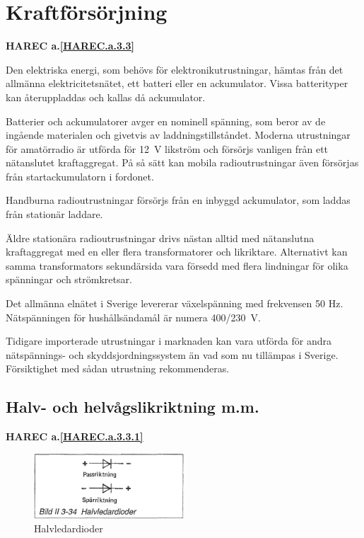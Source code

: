 \section{Kraftförsörjning}
\textbf{HAREC a.\ref{HAREC.a.3.3}\label{myHAREC.a.3.3}}
\label{kraftaggregat}

Den elektriska energi, som behövs för elektronikutrustningar, hämtas
från det allmänna elektricitetsnätet, ett batteri eller en
ackumulator. Vissa batterityper kan återuppladdas och kallas då
ackumulator.

Batterier och ackumulatorer avger en nominell spänning, som beror av
de ingående materialen och givetvis av laddningstillståndet. Moderna
utrustningar för amatörradio är utförda för 12~V likström och försörjs
vanligen från ett nätanslutet kraftaggregat. På så sätt kan mobila
radioutrustningar även försörjas från startackumulatorn i fordonet.

Handburna radioutrustningar försörjs från en inbyggd ackumulator, som
laddas från stationär laddare.

Äldre stationära radioutrustningar drivs nästan alltid med nätanslutna
kraftaggregat med en eller flera transformatorer och
likriktare. Alternativt kan samma transformators sekundärsida vara
försedd med flera lindningar för olika spänningar och strömkretsar.

Det allmänna elnätet i Sverige levererar växelspänning med frekvensen
50 Hz. Nätspänningen för hushållsändamål är numera 400/230~V.

Tidigare importerade utrustningar i marknaden kan vara utförda för
andra nätspännings- och skyddsjordningssystem än vad som nu tillämpas
i Sverige. Försiktighet med sådan utrustning rekommenderas.

\subsection{Halv- och helvågslikriktning m.m.}
\textbf{HAREC a.\ref{HAREC.a.3.3.1}\label{myHAREC.a.3.3.1}}

\begin{figure}
\includegraphics[width=0.5\textwidth]{images/bild_2_3-34}
\caption{Halvledardioder}
\label{fig:BildII3-34}
\end{figure}

